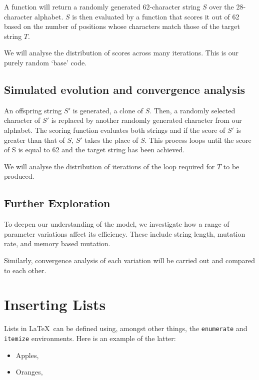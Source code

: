 \documentclass[10pt]{article}
\begin{document}
A function will return a randomly generated 62-character string \(S\) over the 28-character alphabet. \(S\) is then evaluated by a function that scores it out of 62 based on the number of positions whose characters match those of the target string \(T\). 

We will analyse the distribution of scores across many iterations. This is our purely random ‘base’ code.

\subsection{Simulated evolution and convergence analysis}

An offspring string \(S'\) is generated, a clone of \(S\). Then, a randomly selected character of \(S'\) is replaced by another randomly generated character from our alphabet. The scoring function evaluates both strings and if the score of \(S'\) is greater than that of \(S\), \(S'\) takes the place of \(S\). This process loops until the score of S is equal to 62 and the target string has been achieved. 

We will analyse the distribution of iterations of the loop required for \(T\) to be produced.

\subsection{Further Exploration}

To deepen our understanding of the model, we investigate how a range of parameter variations affect its efficiency. These include string length, mutation rate, and memory based mutation. 

Similarly, convergence analysis of each variation will be carried out and compared to each other.

\section{Inserting Lists}

Lists in \LaTeX\ can be defined using, amongst other things, the \texttt{enumerate} and \texttt{itemize} environments. Here is an example of the latter:

\begin{itemize}
\item Apples,
\item Oranges,
\end{itemize}
\end{document}
